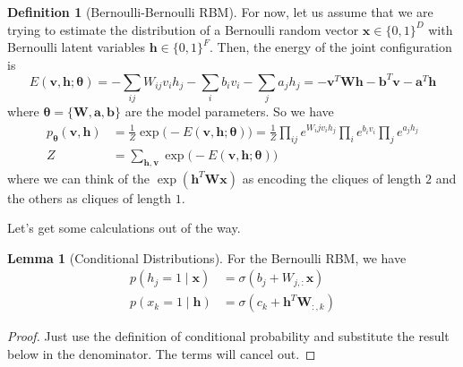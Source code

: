 \documentclass{article}
\theoremstyle{definition}
\newtheorem{lemma}[theorem]{Lemma}
\theoremstyle{remark}
\theoremstyle{definition}
\newtheorem{definition}{Definition}[section]
\begin{document}
\begin{definition}[Bernoulli-Bernoulli RBM]
    For now, let us assume that we are trying to estimate the distribution of a Bernoulli random vector $\mathbf{x} \in \{0, 1\}^D$ with Bernoulli latent variables $\mathbf{h} \in \{0, 1\}^F$. Then, the energy of the joint configuration is  
\[E(\mathbf{v}, \mathbf{h}; \boldsymbol{\theta}) = - \sum_{ij} W_{ij} v_i h_j - \sum_i b_i v_i - \sum_j a_j h_j = - \mathbf{v}^T \mathbf{W} \mathbf{h} - \mathbf{b}^T \mathbf{v} - \mathbf{a}^T \mathbf{h}\]
where $\boldsymbol{\theta} = \{\mathbf{W}, \mathbf{a}, \mathbf{b}\}$ are the model parameters. So we have 
\begin{align*} 
    p_{\boldsymbol{\theta}} (\mathbf{v}, \mathbf{h}) & = \frac{1}{Z} \exp \big( -E (\mathbf{v}, \mathbf{h}; \boldsymbol{\theta})\big) = \frac{1}{Z} \prod_{ij} e^{W_ij v_i h_j} \prod_i e^{b_i v_i} \prod_j e^{a_j h_j} \\
    Z & = \sum_{\mathbf{h}, \mathbf{v}} \exp \big( -E(\mathbf{v}, \mathbf{h}; \boldsymbol{\theta}) \big) 
\end{align*}
where we can think of the $\exp(\mathbf{h}^T \mathbf{W} \mathbf{x})$ as encoding the cliques of length $2$ and the others as cliques of length $1$.  
\end{definition}

Let's get some calculations out of the way. 

\begin{lemma}[Conditional Distributions] 
For the Bernoulli RBM, we have 
\begin{align*} 
    p(h_j = 1 \mid \mathbf{x}) & = \sigma ( b_j + W_{j,:} \mathbf{x}) \\
    p(x_k = 1 \mid \mathbf{h}) & = \sigma ( c_k + \mathbf{h}^T \mathbf{W}_{:, k})
\end{align*}
\end{lemma}
\begin{proof}
Just use the definition of conditional probability and substitute the result below in the denominator. The terms will cancel out. 
\end{proof}
\end{document}
